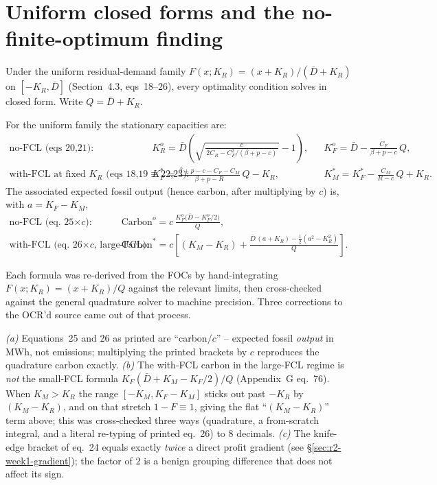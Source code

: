 \section{Uniform closed forms and the no-finite-optimum finding}
\label{sec:r2-week1-uniform}

Under the uniform residual-demand family $F(x;K_R)=(x+K_R)/(\bar D+K_R)$ on
$[-K_R,\bar D]$ (Section~4.3, eqs~18--26), every optimality condition solves in
closed form. Write $Q=\bar D+K_R$.

\begin{proposition}
\label{prop:r2-uniform-cf}
For the uniform family the stationary capacities are:
\begin{align}
\text{no-FCL (eqs~20,21):}\quad
 & K_R^{o}=\bar D\!\left(\sqrt{\tfrac{c}{\,2C_R-C_F^2/(\beta+p-c)\,}}-1\right),
 && K_F^{o}=\bar D-\frac{C_F}{\beta+p-c}\,Q,\\[4pt]
\text{with-FCL at fixed $K_R$ (eqs~18,19$\equiv$22,23):}\quad
 & K_F^{*}=\frac{\beta+p-c-C_F-C_M}{\beta+p-R}\,Q-K_R,
 && K_M^{*}=K_F^{*}-\frac{C_M}{R-c}\,Q+K_R.
\end{align}
The associated expected fossil output (hence carbon, after multiplying by $c$)
is, with $a=K_F-K_M$,
\begin{align}
\text{no-FCL (eq.~25$\times c$):}\quad
 & \mathrm{Carbon}^{o}=c\,\frac{K_F^{o}\bigl(\bar D-K_F^{o}/2\bigr)}{Q},\\[4pt]
\text{with-FCL (eq.~26$\times c$, large-FCL):}\quad
 & \mathrm{Carbon}^{*}=c\!\left[(K_M-K_R)+\frac{\bar D\,(a+K_R)-\tfrac12(a^2-K_R^2)}{Q}\right].
\end{align}
\end{proposition}

Each formula was re-derived from the FOCs by hand-integrating
$F(x;K_R)=(x+K_R)/Q$ against the relevant limits, then cross-checked against the
general quadrature solver to machine precision. Three corrections to the OCR'd
source came out of that process.

\begin{remark}
\label{rem:r2-corrections}
\emph{(a)} Equations~25 and 26 as printed are ``carbon$/c$'' -- expected fossil
\emph{output} in MWh, not emissions; multiplying the printed brackets by $c$
reproduces the quadrature carbon exactly. \emph{(b)} The with-FCL carbon in the
large-FCL regime is \emph{not} the small-FCL formula $K_F(\bar
D+K_M-K_F/2)/Q$ (Appendix~G eq.~76). When $K_M>K_R$ the range $[-K_M,K_F-K_M]$
sticks out past $-K_R$ by $(K_M-K_R)$, and on that stretch $1-F\equiv1$, giving
the flat ``$(K_M-K_R)$'' term above; this was cross-checked three ways
(quadrature, a from-scratch integral, and a literal re-typing of printed eq.~26)
to $8$ decimals. \emph{(c)} The knife-edge bracket of eq.~24 equals exactly
\emph{twice} a direct profit gradient (see \S\ref{sec:r2-week1-gradient}); the
factor of $2$ is a benign grouping difference that does not affect its sign.
\end{remark}

